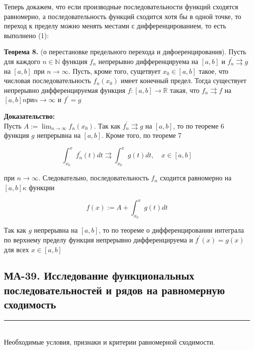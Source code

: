 \documentclass[a4paper,12pt]{article} %
\newcommand{\HRule}{\rule{\linewidth}{0.5mm}}
\begin{document}
	Теперь докажем, что если производные последовательности функций сходятся равномерно, а последовательность функций сходится хотя бы в одной точке, то переход к пределу можно менять местами с дифференцированием, то есть выполнено (1):
	
	\textbf{Теорема 8.} (о перестановке предельного перехода и дифоеренцирования). Пусть для каждого $n \in \mathbb{N}$ функция $f_{n}$ непрерывно дифференцируема на $[a, b]$ и $f_{n}^{\prime} \rightrightarrows g$ на $[a, b]$ при $n \rightarrow \infty$. Пусть, кроме того, сущетвует $x_{0} \in[a, b]$ такое, что числовая последовательность $f_{n}\left(x_{0}\right)$ имеет конечный предел. Тогда существует непрерывно дифференцируемая функция $f:[a, b] \rightarrow \mathbb{R}$ такая, что $f_{n} \rightrightarrows f$ на $[a, b] n р и n \rightarrow \infty$ и $f^{\prime}=g$
	
	\textbf{Доказательство:\\}
	Пусть $A:=\lim _{n \rightarrow \infty} f_{n}\left(x_{0}\right)$. Так как $f_{n}^{\prime} \rightrightarrows g$ на $[a, b]$, то по теореме 6 функция $g$ непрерывна на $[a, b]$. Кроме того, по теореме 7
	
	$$
	\int_{x_{0}}^{x} f_{n}^{\prime}(t) d t \rightrightarrows \int_{x_{0}}^{x} g(t) d t, \quad x \in[a, b]
	$$
	
	при $n \rightarrow \infty$. Следовательно, последовательность $f_{n}$ сходится равномерно на $[a, b] \kappa$ функции
	
	$$
	f(x):=A+\int_{x_{0}}^{x} g(t) d t
	$$
	
	Так как $g$ непрерывна на $[a, b]$, то по теореме о дифференцировании интеграла по верхнему пределу функция непрерывно дифференцируема и $f^{\prime}(x)=g(x)$ для всех $x \in[a, b]$
	



	\newpage

	\newpage

	\begin{LARGE}
		\begin{center}
			\section{МА-39. Исследование функциональных последовательностей и рядов на равномерную сходимость }
		\end{center}
	\end{LARGE}
	\HRule \\


	Необходимые условия, признаки и критерии равномерной сходимости.
	
\end{document}
